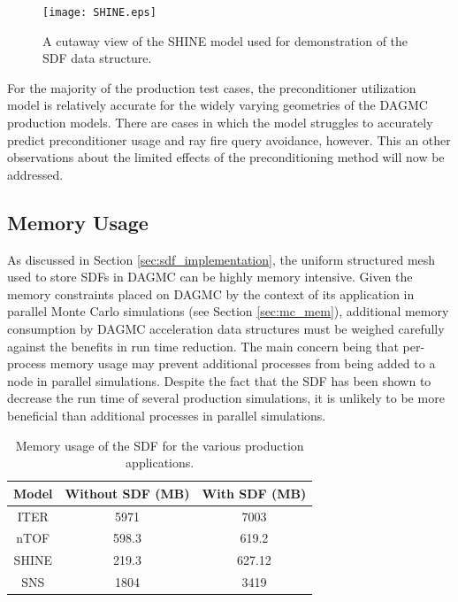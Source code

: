 \begin{figure}
\centering
\texttt{[image: SHINE.eps]}
\caption[A cutaway view of the SHINE CAD model.]{A cutaway view of the SHINE model
  used for demonstration of the SDF data structure.}
\label{fig:shine_sdf}
\end{figure}

For the majority of the production test cases, the preconditioner utilization
model is relatively accurate for the widely varying geometries of the DAGMC
production models.  There are cases in which the model struggles to accurately
predict preconditioner usage and ray fire query avoidance, however. This an other
observations about the limited effects of the preconditioning method will now be
addressed.

\subsection{Memory Usage}

As discussed in Section \ref{sec:sdf_implementation}, the uniform structured
mesh used to store SDFs in DAGMC can be highly memory intensive. Given the
memory constraints placed on DAGMC by the context of its application in parallel
Monte Carlo simulations (see Section \ref{sec:mc_mem}), additional memory
consumption by DAGMC acceleration data structures must be weighed
carefully against the benefits in run time reduction. The main concern being
that per-process memory usage may prevent additional processes from being added
to a node in parallel simulations. Despite the fact that the SDF has been shown
to decrease the run time of several production simulations, it is unlikely to be
more beneficial than additional processes in parallel simulations.

\begin{table}[H]
  \centering
  \begin{tabular}{c c c}
    \toprule
    \textbf{Model} & \textbf{Without SDF (MB)} & \textbf{With SDF (MB)} \\
    \hline
    ITER  & 5971  & 7003   \\
    nTOF  & 598.3 & 619.2  \\
    SHINE & 219.3 & 627.12 \\
    SNS   & 1804  & 3419   \\
    \bottomrule
  \end{tabular}
  \caption[SDF production memory usage.]{Memory usage of the SDF for the various
    production applications.}
  \label{tab:sdf_prod_mem}
\end{table}

